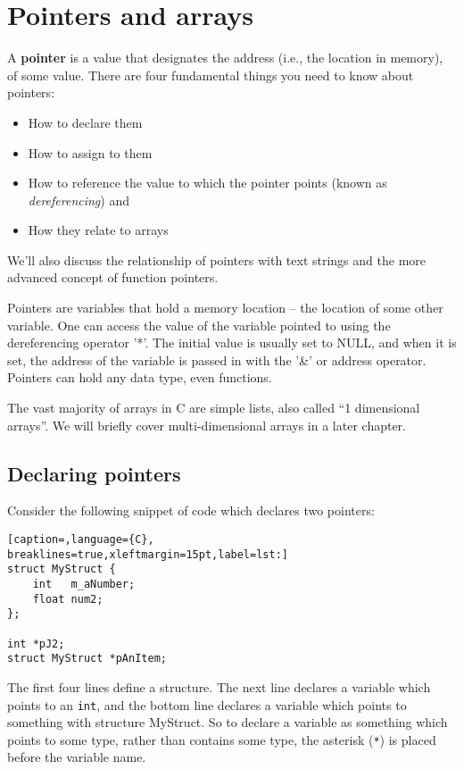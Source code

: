 \section{Pointers and arrays}
A \textbf{pointer} is a value that designates the address (i.e., the location
in memory), of some value. There are four fundamental things you need to know
about pointers:

\begin{itemize}
	\item How to declare them
	\item How to assign to them
	\item How to reference the value to which the pointer points (known as
\emph{dereferencing}) and
	\item How they relate to arrays
\end{itemize}

We'll also discuss the relationship of pointers with text strings and the more
advanced concept of function pointers.

Pointers are variables that hold a memory location -- the location of some
other variable.  One can access the value of the variable pointed to using the
dereferencing operator '*'. The initial value is usually set to NULL, and when
it is set, the address of the variable is passed in with the '\&' or address
operator.  Pointers can hold any data type, even functions.

The vast majority of arrays in C are simple lists, also called ``1 dimensional
arrays''. We will briefly cover multi-dimensional arrays in a later chapter.

\subsection{Declaring pointers}
Consider the following snippet of code which declares two pointers:
\lstset{basicstyle=\scriptsize, numbers=left, captionpos=b, tabsize=4}
\begin{lstlisting}[caption=,language={C},
breaklines=true,xleftmargin=15pt,label=lst:]
struct MyStruct {
	int   m_aNumber;
	float num2;
};

int *pJ2;
struct MyStruct *pAnItem;
\end{lstlisting}

The first four lines define a structure.  The next line declares a variable
which points to an \texttt{int}, and the bottom line declares a variable which
points to something with structure MyStruct. So to declare a variable as
something which points to some type, rather than contains some type, the
asterisk (\texttt{*}) is placed before the variable name. 

